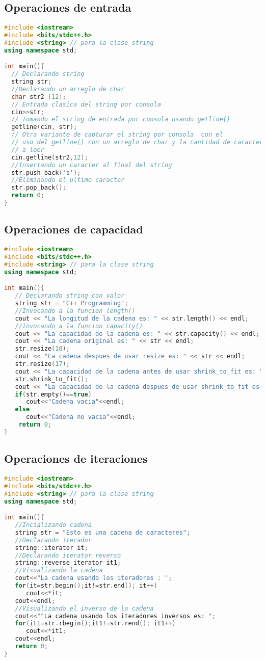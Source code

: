 \subsection{Operaciones de entrada}
\begin{lstlisting}[language=C++]
#include <iostream>
#include <bits/stdc++.h>
#include <string> // para la clase string
using namespace std;

int main(){
  // Declarando string
  string str;
  //Declarando un arreglo de char
  char str2 [12];
  // Entrada clasica del string por consola
  cin>>str;
  // Tomando el string de entrada por consola usando getline()
  getline(cin, str);
  // Otra variante de capturar el string por consola  con el
  // uso del getline() con un arreglo de char y la cantidad de caracteres
  // a leer
  cin.getline(str2,12);
  //Insertando un caracter al final del string
  str.push_back('s');
  //Eliminando el ultimo caracter
  str.pop_back();
  return 0;
}
\end{lstlisting}
\subsection{Operaciones de capacidad}
\begin{lstlisting}[language=C++]
#include <iostream>
#include <bits/stdc++.h>
#include <string> // para la clase string
using namespace std;

int main(){
   // Declarando string con valor
   string str = "C++ Programming";
   //Invocando a la funcion length()
   cout << "La longitud de la cadena es: " << str.length() << endl;
   //Invocando a la funcion capacity()
   cout << "La capacidad de la cadena es: " << str.capacity() << endl;
   cout << "La cadena original es: " << str << endl;
   str.resize(10);
   cout << "La cadena despues de usar resize es: " << str << endl;
   str.resize(17);
   cout << "La capacidad de la cadena antes de usar shrink_to_fit es: "<<str.capacity() << endl;
   str.shrink_to_fit();
   cout << "La capacidad de la cadena despues de usar shrink_to_fit es: " << str.capacity() << endl;
   if(str.empty()==true)
      cout<<"Cadena vacia"<<endl;
   else
      cout<<"Cadena no vacia"<<endl;
	return 0;
}	
\end{lstlisting}
\subsection{Operaciones de iteraciones}
\begin{lstlisting}[language=C++]
#include <iostream>
#include <bits/stdc++.h>
#include <string> // para la clase string
using namespace std;

int main(){
   //Incializando cadena 
   string str = "Esto es una cadena de caracteres"; 
   //Declarando iterador 
   string::iterator it; 
   //Declarando iterator reverso  
   string::reverse_iterator it1; 
   //Visualizando la cadena
   cout<<"La cadena usando los iteradores : "; 
   for(it=str.begin();it!=str.end(); it++) 
      cout<<*it; 
   cout<<endl; 
   //Visualizando el inverso de la cadena 
   cout<<""La cadena usando los iteradores inversos es: "; 
   for(it1=str.rbegin();it1!=str.rend(); it1++) 
      cout<<*it1; 
   cout<<endl; 
   return 0;
}	
\end{lstlisting}
